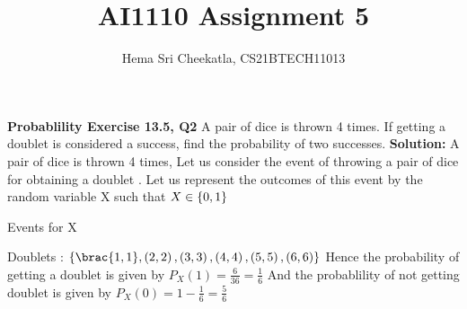 \documentclass[journal,12pt,twocolumn]{IEEEtran}
\begin{document}
\makeatother
\let\StandardTheFigure\thefigure
\let\vec\mathbf
\renewcommand{\thefigure}{\theproblem}
\def\putbox#1#2#3{\makebox[0in][l]{\makebox[#1][l]{}\raisebox{\baselineskip}[0in][0in]{\raisebox{#2}[0in][0in]{#3}}}}
     \def\rightbox#1{\makebox[0in][r]{#1}}
     \def\centbox#1{\makebox[0in]{#1}}
     \def\topbox#1{\raisebox{-\baselineskip}[0in][0in]{#1}}
     \def\midbox#1{\raisebox{-0.5\baselineskip}[0in][0in]{#1}}
\vspace{3cm}
\title{AI1110 Assignment 5}
\author{ Hema Sri Cheekatla, CS21BTECH11013}	
\maketitle
\begin{flushleft}
\textbf{Probablility Exercise 13.5, Q2}
A pair of dice is thrown 4 times. If getting a doublet is considered a success, find
the probability of two successes.
\textbf{Solution:}
A pair of dice is thrown 4 times,\newline
Let us consider the event of throwing a pair of dice for obtaining a doublet . Let us represent the outcomes of this event by the random variable X such that $X \in \left\{0, 1\right\}$ \newline
\begin{table}[h]
    \centering
	\caption{Events for X}
	\label{tab:mesh}
	
\end{table}

Doublets : $\cbrak{\brac{1, 1}, \brak{2, 2}, \brak{3, 3}, \brak{4, 4}, \brak{5, 5}, \brak{6, 6}}$\newline
Hence the probability of getting a doublet is given by $P_X(1) = \frac{6}{36} = \frac{1}{6}$ \newline
And the probablility of not getting doublet is given by $P_X(0) = 1-\frac{1}{6} = \frac{5}{6}$ \newline


\end{flushleft}
\end{document}
